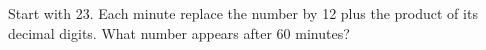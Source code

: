 Start with 23. Each minute replace the number by 12 plus the product of its decimal digits. What number appears after 60 minutes?
